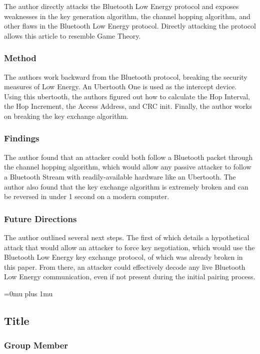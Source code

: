 \noindent
The author directly attacks the Bluetooth Low Energy protocol and exposes weaknesses in the key generation algorithm, the channel hopping algorithm, and other flaws in the Bluetooth Low Energy protocol.  Directly attacking the protocol allows this article to resemble Game Theory.

\subsubsection{Method}

\noindent
The authors work backward from the Bluetooth protocol, breaking the security measures of Low Energy.  An Ubertooth One is used as the intercept device.  Using this ubertooth, the authors figured out how to calculate the Hop Interval, the Hop Increment, the Access Address, and CRC init.  Finally, the author works on breaking the key exchange algorithm.

\subsubsection{Findings}

\noindent
The author found that an attacker could both follow a Bluetooth packet through the channel hopping algorithm, which would allow any passive attacker to follow a Bluetooth Stream with readily-available hardware like an Ubertooth.  The author also found that the key exchange algorithm is extremely broken and can be reversed in under 1 second on a modern computer.

\subsubsection{Future Directions}

\noindent
The author outlined several next steps.  The first of which details a hypothetical attack that would allow an attacker to force key negotiation, which would use the Bluetooth Low Energy key exchange protocol, of which was already broken in this paper.  From there, an attacker could effectively decode any live Bluetooth Low Energy communication, even if not present during the initial pairing process.

\Urlmuskip=0mu plus 1mu\relax

\noindent
\subsection{Title}

\subsubsection{Group Member}


